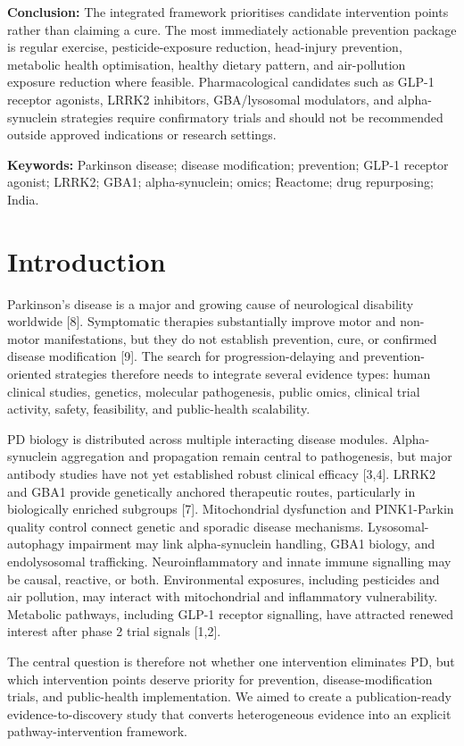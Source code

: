 \documentclass{article}
\begin{document}
\textbf{Conclusion:} The integrated framework prioritises candidate intervention points rather than claiming a cure. The most immediately actionable prevention package is regular exercise, pesticide-exposure reduction, head-injury prevention, metabolic health optimisation, healthy dietary pattern, and air-pollution exposure reduction where feasible. Pharmacological candidates such as GLP-1 receptor agonists, LRRK2 inhibitors, GBA/lysosomal modulators, and alpha-synuclein strategies require confirmatory trials and should not be recommended outside approved indications or research settings.


\textbf{Keywords:} Parkinson disease; disease modification; prevention; GLP-1 receptor agonist; LRRK2; GBA1; alpha-synuclein; omics; Reactome; drug repurposing; India.


\section{Introduction}

Parkinson's disease is a major and growing cause of neurological disability worldwide [8]. Symptomatic therapies substantially improve motor and non-motor manifestations, but they do not establish prevention, cure, or confirmed disease modification [9]. The search for progression-delaying and prevention-oriented strategies therefore needs to integrate several evidence types: human clinical studies, genetics, molecular pathogenesis, public omics, clinical trial activity, safety, feasibility, and public-health scalability.


PD biology is distributed across multiple interacting disease modules. Alpha-synuclein aggregation and propagation remain central to pathogenesis, but major antibody studies have not yet established robust clinical efficacy [3,4]. LRRK2 and GBA1 provide genetically anchored therapeutic routes, particularly in biologically enriched subgroups [7]. Mitochondrial dysfunction and PINK1-Parkin quality control connect genetic and sporadic disease mechanisms. Lysosomal-autophagy impairment may link alpha-synuclein handling, GBA1 biology, and endolysosomal trafficking. Neuroinflammatory and innate immune signalling may be causal, reactive, or both. Environmental exposures, including pesticides and air pollution, may interact with mitochondrial and inflammatory vulnerability. Metabolic pathways, including GLP-1 receptor signalling, have attracted renewed interest after phase 2 trial signals [1,2].


The central question is therefore not whether one intervention eliminates PD, but which intervention points deserve priority for prevention, disease-modification trials, and public-health implementation. We aimed to create a publication-ready evidence-to-discovery study that converts heterogeneous evidence into an explicit pathway-intervention framework.
\end{document}
